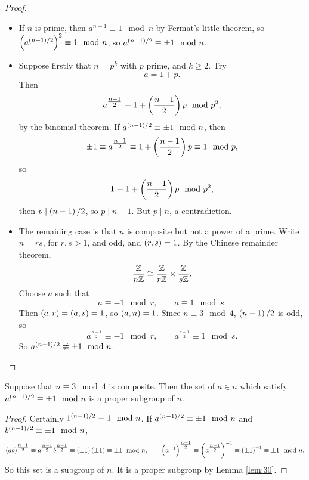 \begin{proof}
\hfill
\begin{itemize}
\item If $ n $ is prime, then $ a^{n - 1} \equiv 1 \mod n $ by Fermat's little theorem, so $ \br{a^{\br{n - 1} / 2}}^2 \equiv 1 \mod n $, so $ a^{\br{n - 1} / 2} \equiv \pm 1 \mod n $.
\item Suppose firstly that $ n = p^k $ with $ p $ prime, and $ k \ge 2 $. Try
$$ a = 1 + p. $$
Then
$$ a^{\tfrac{n - 1}{2}} \equiv 1 + \br{\dfrac{n - 1}{2}}p \mod p^2, $$
by the binomial theorem. If $ a^{\br{n - 1} / 2} \equiv \pm 1 \mod n $, then
$$ \pm 1 \equiv a^{\tfrac{n - 1}{2}} \equiv 1 + \br{\dfrac{n - 1}{2}}p \equiv 1 \mod p, $$
so
$$ 1 \equiv 1 + \br{\dfrac{n - 1}{2}}p \mod p^2, $$
then $ p \mid \br{n - 1} / 2 $, so $ p \mid n - 1 $. But $ p \mid n $, a contradiction.
\item The remaining case is that $ n $ is composite but not a power of a prime. Write $ n = rs $, for $ r, s > 1 $, and odd, and $ \br{r, s} = 1 $. By the Chinese remainder theorem,
$$ \dfrac{\mathbb{Z}}{n\mathbb{Z}} \cong \dfrac{\mathbb{Z}}{r\mathbb{Z}} \times \dfrac{\mathbb{Z}}{s\mathbb{Z}}. $$
Choose $ a $ such that
$$ a \equiv -1 \mod r, \qquad a \equiv 1 \mod s. $$
Then $ \br{a, r} = \br{a, s} = 1 $, so $ \br{a, n} = 1 $. Since $ n \equiv 3 \mod 4 $, $ \br{n - 1} / 2 $ is odd, so
$$ a^{\tfrac{n - 1}{2}} \equiv -1 \mod r, \qquad a^{\tfrac{n - 1}{2}} \equiv 1 \mod s. $$
So $ a^{\br{n - 1} / 2} \not\equiv \pm 1 \mod n $.
\end{itemize}
\end{proof}

\begin{lemma}
\label{lem:31}
Suppose that $ n \equiv 3 \mod 4 $ is composite. Then the set of $ a \in \unit{n} $ which satisfy $ a^{\br{n - 1} / 2} \equiv \pm 1 \mod n $ is a proper subgroup of $ \unit{n} $.
\end{lemma}

\begin{proof}
Certainly $ 1^{\br{n - 1} / 2} \equiv 1 \mod n $. If $ a^{\br{n - 1} / 2} \equiv \pm 1 \mod n $ and $ b^{\br{n - 1} / 2} \equiv \pm 1 \mod n $,
$$ \br{ab}^{\tfrac{n - 1}{2}} \equiv a^{\tfrac{n - 1}{2}}b^{\tfrac{n - 1}{2}} \equiv \br{\pm 1}\br{\pm 1} \equiv \pm 1 \mod n, \qquad \br{a^{-1}}^{\tfrac{n - 1}{2}} \equiv \br{a^{\tfrac{n - 1}{2}}}^{-1} \equiv \br{\pm 1}^{-1} \equiv \pm 1 \mod n. $$
So this set is a subgroup of $ \unit{n} $. It is a proper subgroup by Lemma \ref{lem:30}.
\end{proof}

